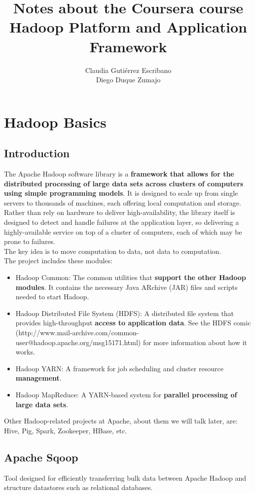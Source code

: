 \documentclass{article}
\title{Notes about the Coursera course \\ \textbf{Hadoop Platform and Application Framework}}
\author{Claudia Guti\'errez Escribano \\ Diego Duque Zumajo}
\begin{document}
\maketitle
\section*{\color{blue}Hadoop Basics\color{black}}
\subsection{Introduction}
The Apache Hadoop software library is a \textbf{framework that allows for the distributed processing of large data sets across clusters of computers using simple programming models}. It is designed to scale up from single servers to thousands of machines, each offering local computation and storage. Rather than rely on hardware to deliver high-availability, the library itself is designed to detect and handle failures at the application layer, so delivering a highly-available service on top of a cluster of computers, each of which may be prone to failures.\\
The key idea is to move computation to data, not data to computation. \\
The project includes these modules:
\begin{itemize}
\item Hadoop Common: The common utilities that \textbf{support the other Hadoop modules}. It contains the necessary Java ARchive (JAR) files and scripts needed to start Hadoop. 
\item Hadoop Distributed File System (HDFS): A distributed file system that provides high-throughput \textbf{access to application data}. See the HDFS comic (http://www.mail-archive.com/common-user@hadoop.apache.org/msg15171.html) for more information about how it works. 
\item Hadoop YARN: A framework for job scheduling and cluster resource \textbf{management}.
\item Hadoop MapReduce: A YARN-based system for \textbf{parallel processing of large data sets}.
\end{itemize}
Other Hadoop-related projects at Apache, about them we will talk later, are: Hive, Pig, Spark, Zookeeper, HBase, etc.  
\subsection{Apache Sqoop}
Tool designed for efficiently transferring bulk data between Apache Hadoop and structure datastores such as relational databases. 
\end{document}
